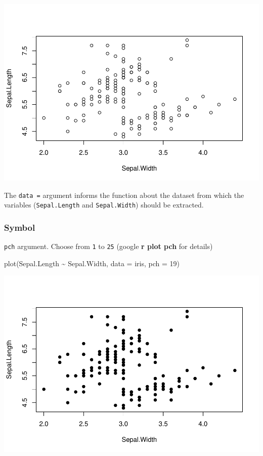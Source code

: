 \documentclass[
]{article}
\newenvironment{Shaded}{\begin{snugshade}}{\end{snugshade}}
\newcommand{\AttributeTok}[1]{\textcolor[rgb]{0.77,0.63,0.00}{#1}}
\newcommand{\DecValTok}[1]{\textcolor[rgb]{0.00,0.00,0.81}{#1}}
\newcommand{\FunctionTok}[1]{\textcolor[rgb]{0.00,0.00,0.00}{#1}}
\newcommand{\NormalTok}[1]{#1}
\newcommand{\SpecialCharTok}[1]{\textcolor[rgb]{0.00,0.00,0.00}{#1}}
\begin{document}
\begin{center}\includegraphics{biostats_files/figure-latex/unnamed-chunk-123-1} \end{center}

The \texttt{data\ =} argument informs the function about the dataset from which the variables (\texttt{Sepal.Length} and \texttt{Sepal.Width}) should be extracted.

\hypertarget{symbol}{%
\subsubsection{Symbol}\label{symbol}}

\texttt{pch} argument. Choose from \texttt{1} to \texttt{25} (google \textbf{r plot pch} for details)

\begin{Shaded}
\begin{Highlighting}[]
\FunctionTok{plot}\NormalTok{(Sepal.Length }\SpecialCharTok{\textasciitilde{}}\NormalTok{ Sepal.Width, }\AttributeTok{data =}\NormalTok{ iris,}
     \AttributeTok{pch =} \DecValTok{19}\NormalTok{)}
\end{Highlighting}
\end{Shaded}

\begin{center}\includegraphics{biostats_files/figure-latex/unnamed-chunk-124-1} \end{center}
\end{document}
